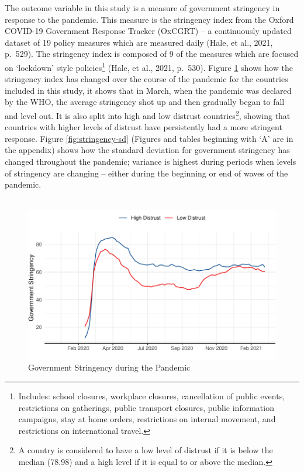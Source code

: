 \documentclass[
  12pt,
]{article}
\begin{document}
The outcome variable in this study is a measure of government stringency in response to the pandemic. This measure is the stringency index from the Oxford COVID-19 Government Response Tracker (OxCGRT) -- a continuously updated dataset of 19 policy measures which are measured daily (Hale, et al., 2021, p.~529). The stringency index is composed of 9 of the measures which are focused on `lockdown' style policies\footnote{Includes: school closures, workplace closures, cancellation of public events, restrictions on gatherings, public transport closures, public information campaigns, stay at home orders, restrictions on internal movement, and restrictions on international travel.} (Hale, et al., 2021, p.~530). Figure \ref{fig:stringency-plot} shows how the stringency index has changed over the course of the pandemic for the countries included in this study, it shows that in March, when the pandemic was declared by the WHO, the average stringency shot up and then gradually began to fall and level out. It is also split into high and low distrust countries\footnote{A country is considered to have a low level of distrust if it is below the median (78.98) and a high level if it is equal to or above the median.}, showing that countries with higher levels of distrust have persistently had a more stringent response. Figure \ref{fig:stringency-sd} (Figures and tables beginning with `A' are in the appendix) shows how the standard deviation for government stringency has changed throughout the pandemic; variance is highest during periods when levels of stringency are changing -- either during the beginning or end of waves of the pandemic.\\
~\\

\begin{figure}
\includegraphics[width=0.8\linewidth]{write_up_test_files/figure-latex/stringency-plot-1} \caption{Government Stringency during the Pandemic}\label{fig:stringency-plot}
\end{figure}
\end{document}
